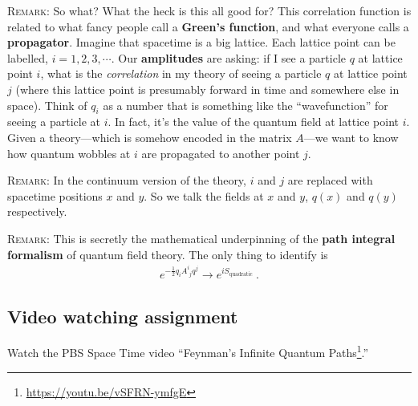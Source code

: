 \documentclass[12pt]{article}
\begin{document}
\textsc{Remark}: So what? What the heck is this all good for? This correlation function is related to what fancy people call a \textbf{Green's function}, and what everyone calls a \textbf{propagator}. Imagine that spacetime is a big lattice. Each lattice point can be labelled, $i=1,2,3,\cdots$. 
%
Our \textbf{amplitudes} are asking: if I see a particle $q$ at lattice point $i$, what is the \emph{correlation} in my theory of seeing a particle $q$ at lattice point $j$ (where this lattice point is presumably forward in time and somewhere else in space).  Think of $q_i$ as a number that is something like the ``wavefunction'' for seeing a particle at $i$. In fact, it's the value of the quantum field at lattice point $i$. Given a theory---which is somehow encoded in the matrix $A$---we want to know how quantum wobbles at $i$ are propagated to another point $j$.

\textsc{Remark}: In the continuum version of the theory, $i$ and $j$ are replaced with spacetime positions $x$ and $y$. So we talk the fields at $x$ and $y$, $q(x)$ and $q(y)$ respectively. 

\textsc{Remark}: This is secretly the mathematical underpinning of the \textbf{path integral formalism} of quantum field theory. The only thing to identify is
\begin{align}
	e^{-\frac 12 q_i A^i_{\phantom{i}j} q^j} \to e^{iS_\text{quadratic}} \ .
\end{align}


\subsection{Video watching assignment}

Watch the PBS Space Time video ``Feynman's Infinite Quantum Paths\footnote{\url{https://youtu.be/vSFRN-ymfgE}}.'' 
\end{document}
